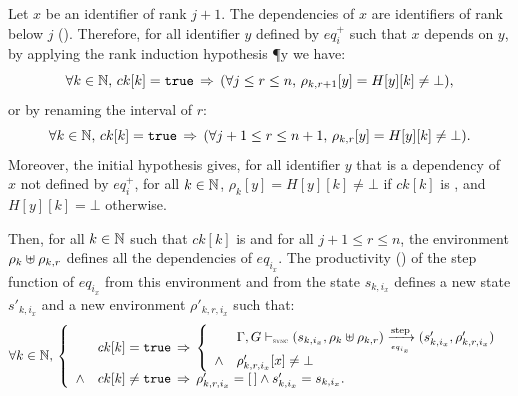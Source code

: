 \begin{skippableproof}
\begin{itemize}
              Let $x$ be an identifier of rank $j+1$. The dependencies of $x$ are identifiers
              of rank below $j$ ().
              Therefore, for all identifier $y$ defined by $eq_i^+$ such that $x$ depends on $y$,
              by applying the rank induction hypothesis \P{y} we have:
              \begin{equation*}
                  \forall k \in \mathbb{N}, \, ck[k] = \mathtt{{true}} \, \Rightarrow \,
                  (\forall j \le r \le n, \, \rho_{k,r+1}[y] = H[y][k] \neq \bot),
              \end{equation*}
              or by renaming the interval of $r$:
              \begin{equation*}
                  \forall k \in \mathbb{N}, \, ck[k] = \mathtt{{true}} \, \Rightarrow \,
                  (\forall j+1 \le r \le n+1, \, \rho_{k,r}[y] = H[y][k] \neq \bot).
              \end{equation*}
              Moreover, the initial hypothesis gives, for all identifier $y$ that is a dependency of $x$
              not defined by $eq_i^+$, for all $k \in \mathbb{N}$, $\rho_k[y] = H[y][k] \neq \bot$
              if $ck[k]$ is \true, and $H[y][k] = \bot$ otherwise.

              Then, for all $k \in \mathbb{N}$ such that $ck[k]$ is \true and for all
              $j+1 \le r \le n$, the environment $\rho_k \uplus \rho_{k,r}$ defines all the
              dependencies of $eq_{i_x}$. The productivity () of the step function of $eq_{i_x}$ from this environment and from
              the state $s_{k,i_x}$ defines a new state $s'_{k,i_x}$ and a new environment
              $\rho'_{k,r,i_x}$ such that:
              \begin{equation*}
                  \forall k \in \N, \,
                  \left\{
                  \begin{array}{ll}
                             & ck[k] = \true \, \Rightarrow \,
                      \left\{
                      \begin{array}{ll}
                                 & \eqOpsem{\rho_k \ctxconcat \rho_{k,r}}{s_{k,i_x}}{eq_{i_x}}{s'_{k,i_x}}{\rho'_{k,r,i_x}} \\
                          \wedge & \rho'_{k,r,i_x}[x] \neq \bot                                                             \\
                      \end{array}
                      \right.                                                                                                \\
                      \wedge & ck[k] \neq \true \, \Rightarrow \, \rho'_{k,r,i_x} = \emptyrho \wedge s'_{k,i_x} = s_{k,i_x}. \\
                  \end{array}
                  \right.
              \end{equation*}


\end{itemize}
\end{skippableproof}
